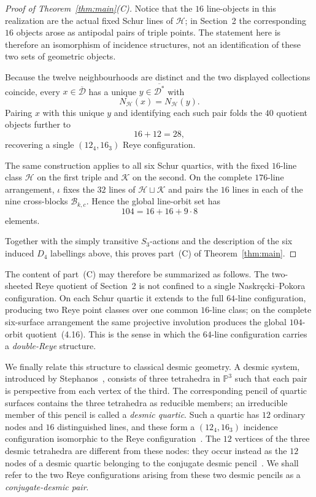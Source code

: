 \documentclass[10pt]{article}
\newcommand{\PP}{\mathbb P}
\begin{document}
\begin{proof}[Proof of Theorem~\ref{thm:main}\textup{(C)}]
Notice that the $16$ line-objects in this realization are the actual
fixed Schur lines of $\mathcal H$; in Section~2 the corresponding
$16$ objects arose as antipodal pairs of triple points.  The statement
here is therefore an isomorphism of incidence structures, not an
identification of these two sets of geometric objects.

Because the twelve neighbourhoods are distinct and the two displayed
collections coincide, every
$x\in\overline{\mathcal D}$ has a unique
$y\in\overline{\mathcal D^*}$ with
\[
N_{\mathcal H}(x)=N_{\mathcal H}(y).
\]
Pairing $x$ with this unique $y$ and identifying each such pair folds
the $40$ quotient objects further to
\[
16+12=28,
\]
recovering a single $(12_4,16_3)$ Reye configuration.

The same construction applies to all six Schur quartics, with the fixed
$16$-line class $\mathcal H$ on the first triple and $\mathcal K$ on the
second.  On the complete $176$-line arrangement, $\iota$ fixes the
$32$ lines of $\mathcal H\sqcup\mathcal K$ and pairs the $16$ lines in
each of the nine cross-blocks $\mathcal B_{k,c}$.  Hence the global
line-orbit set has
\[
104=16+16+9\cdot8
\tag{4.16}
\]
elements.

Together with the simply transitive $S_3$-actions and the description of
the six induced $D_4$ labellings above, this proves
part~\textup{(C)} of Theorem~\ref{thm:main}.
\end{proof}

The content of part~\textup{(C)} may therefore be summarized as follows.
The two-sheeted Reye quotient of Section~2 is not confined to a single
Naskr\k{e}cki--Pokora configuration.  On each Schur quartic it extends to
the full $64$-line configuration, producing two Reye point classes over one
common $16$-line class; on the complete six-surface arrangement the same
projective involution produces the global $104$-orbit quotient~(4.16).
This is the sense in which the $64$-line configuration carries a
\emph{double-Reye} structure.

We finally relate this structure to classical desmic geometry.  A desmic
system, introduced by Stephanos~\cite{Stephanos79}, consists of three
tetrahedra in $\PP^3$ such that each pair is perspective from each vertex
of the third.  The corresponding pencil of quartic surfaces contains the
three tetrahedra as reducible members; an irreducible member of this pencil
is called a \emph{desmic quartic}. Such a quartic has $12$ ordinary nodes and $16$ distinguished lines,
and these form a $(12_4,16_3)$ incidence configuration isomorphic to
the Reye configuration~\cite{DK25}.  The $12$ vertices of the three
desmic tetrahedra are different from these nodes: they occur instead as
the $12$ nodes of a desmic quartic belonging to the conjugate desmic
pencil~\cite{DK25}.  We shall refer to the two Reye configurations
arising from these two desmic pencils as a \emph{conjugate-desmic pair}.
\end{document}
